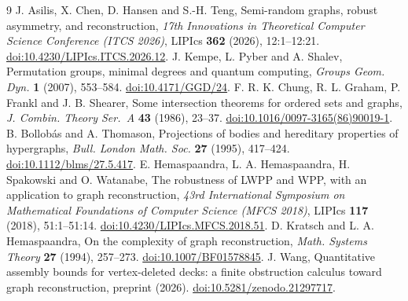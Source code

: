 \documentclass[11pt]{article}
\theoremstyle{definition}\newtheorem{definition}[theorem]{Definition}\theoremstyle{plain}
\begin{document}
\begin{thebibliography}{9}
 J. Asilis, X. Chen, D. Hansen and S.-H. Teng,
Semi-random graphs, robust asymmetry, and reconstruction,
\emph{17th Innovations in Theoretical Computer Science Conference (ITCS 2026)},
LIPIcs \textbf{362} (2026), 12:1--12:21.
\href{https://doi.org/10.4230/LIPIcs.ITCS.2026.12}{doi:10.4230/LIPIcs.ITCS.2026.12}.
 J. Kempe, L. Pyber and A. Shalev,
Permutation groups, minimal degrees and quantum computing,
\emph{Groups Geom. Dyn.} \textbf{1} (2007), 553--584.
\href{https://doi.org/10.4171/GGD/24}{doi:10.4171/GGD/24}.
 F. R. K. Chung, R. L. Graham, P. Frankl and J. B. Shearer,
Some intersection theorems for ordered sets and graphs,
\emph{J. Combin. Theory Ser.~A} \textbf{43} (1986), 23--37.
\href{https://doi.org/10.1016/0097-3165(86)90019-1}{doi:10.1016/0097-3165(86)90019-1}.
 B. Bollob\'as and A. Thomason,
Projections of bodies and hereditary properties of hypergraphs,
\emph{Bull. London Math. Soc.} \textbf{27} (1995), 417--424.
\href{https://doi.org/10.1112/blms/27.5.417}{doi:10.1112/blms/27.5.417}.
 E. Hemaspaandra, L. A. Hemaspaandra, H. Spakowski and O. Watanabe,
The robustness of LWPP and WPP, with an application to graph reconstruction,
\emph{43rd International Symposium on Mathematical Foundations of Computer Science (MFCS 2018)}, LIPIcs \textbf{117} (2018), 51:1--51:14.
\href{https://doi.org/10.4230/LIPIcs.MFCS.2018.51}{doi:10.4230/LIPIcs.MFCS.2018.51}.
 D. Kratsch and L. A. Hemaspaandra,
On the complexity of graph reconstruction,
\emph{Math. Systems Theory} \textbf{27} (1994), 257--273.
\href{https://doi.org/10.1007/BF01578845}{doi:10.1007/BF01578845}.
 J. Wang, Quantitative assembly bounds for vertex-deleted decks: a finite obstruction calculus toward graph reconstruction, preprint (2026).
\href{https://doi.org/10.5281/zenodo.21297717}{doi:10.5281/zenodo.21297717}.
\end{thebibliography}
\end{document}
